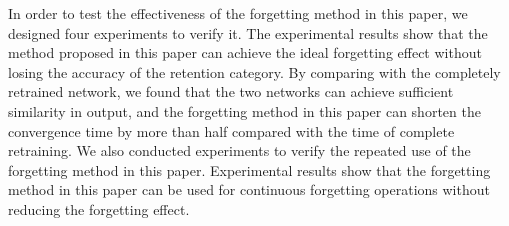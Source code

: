 \begin{abstract*}
  In order to test the effectiveness of the forgetting method in this paper, we designed four experiments to verify it. 
  The experimental results show that the method proposed in this paper can achieve the ideal forgetting effect without losing the accuracy of the retention category.
  By comparing with the completely retrained network, we found that the two networks can achieve sufficient similarity in output, 
  and the forgetting method in this paper can shorten the convergence time by more than half compared with the time of complete retraining.
  We also conducted experiments to verify the repeated use of the forgetting method in this paper. 
  Experimental results show that the forgetting method in this paper can be used for continuous forgetting operations without reducing the forgetting effect.

\end{abstract*}
